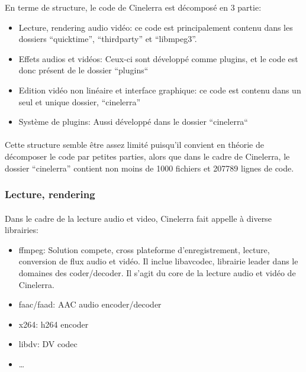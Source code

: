 En terme de structure, le code de Cinelerra est décomposé en 3 partie:

\begin{itemize}

  \item{Lecture, rendering  audio vidéo: ce code est principalement
    contenu dans les dossiers ``quicktime'', ``thirdparty'' et
    ``libmpeg3''.}

  \item{Effets audios et vidéos: Ceux-ci sont développé comme plugins,
    et le code est donc présent de le dossier ``plugins`` }

  \item{Edition vidéo non linéaire et interface graphique: ce code est
    contenu dans un seul et unique dossier, ``cinelerra''}

  \item{Système de plugins: Aussi développé dans le dossier
  ``cinelerra``}

\end{itemize}

\paragraph{}

Cette structure semble être assez limité puisqu'il convient en théorie
de décomposer le code par petites parties, alors que dans le cadre de
Cinelerra, le dossier ``cinelerra'' contient non  moins de 1000 fichiers
et 207789 lignes de code.

\subsubsection{Lecture, rendering}

\paragraph{}

Dans le cadre de la lecture audio et video, Cinelerra fait appelle à
diverse librairies:

\begin{itemize}

  \item{ffmpeg: Solution compete, cross plateforme
  d'enregistrement, lecture, conversion de flux audio et vidéo. Il
  inclue libavcodec, librairie leader dans le domaines des
  coder/decoder.
Il s'agit du core de la
  lecture audio et vidéo de Cinelerra.}

  \item{faac/faad: AAC audio encoder/decoder}

  \item{x264: h264 encoder}

  \item{libdv: DV codec}

  \item{\ldots}

\end{itemize}

